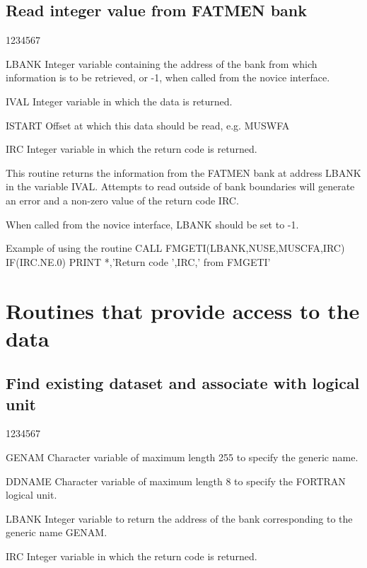 \subsection{Read integer value from FATMEN bank}
\begin{DLtt}{1234567}
\item[LBANK]
Integer variable containing the address of the bank from which
information is to be retrieved,
or -1, when called from
the novice interface.
\item[ IVAL]
Integer variable in which the data is returned.
\item[ISTART]
Offset at which this data should be read, e.g. MUSWFA
\item[IRC]
Integer variable in which the return code is returned.
\end{DLtt}
\par
This routine returns the information from
the FATMEN bank at address LBANK
in the variable IVAL. Attempts to read outside of
bank boundaries will generate an error and a non-zero value of the
return code IRC.
\par
When called from the novice interface, LBANK should be set to -1.
\begin{XMPt} {Example of using the \protect{} routine}
      CALL FMGETI(LBANK,NUSE,MUSCFA,IRC)
      IF(IRC.NE.0) PRINT *,'Return code ',IRC,' from FMGETI'
\end{XMPt}
\section{Routines that provide access to the data}
\subsection{Find existing dataset and associate with logical unit}
\begin{DLtt}{1234567}
\item[GENAM]
Character variable of maximum length 255 to specify the generic name.
\item[DDNAME ]
Character variable of maximum length 8 to specify the FORTRAN logical
unit.
\item[LBANK]
Integer variable to return the address of the bank corresponding
to the generic name GENAM.
\item[IRC]
Integer variable in which the return code is returned.
\end{DLtt}

